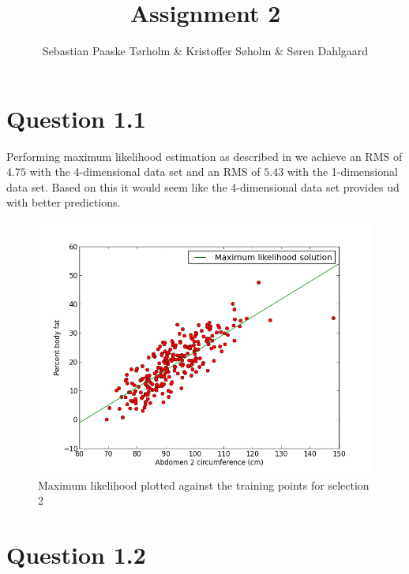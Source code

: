 \documentclass[11pt,a4paper]{article}
\title{Assignment 2}
\author{Sebastian Paaske Tørholm \& Kristoffer Søholm \& Søren Dahlgaard}
\begin{document}
\maketitle

\section{Question 1.1}
Performing maximum likelihood estimation as described in
\cite[sec. 3.1.1]{Bishop} we achieve an RMS of $4.75$ with the 4-dimensional
data set and an RMS of $5.43$ with the 1-dimensional data set. Based on this
it would seem like the 4-dimensional data set provides ud with better
predictions.

\begin{figure}[h!]
    \includegraphics[width=\textwidth]{images/prob11-sel2.png}
    \caption{Maximum likelihood plotted against the training points for selection 2}
\end{figure}

\section{Question 1.2}

\end{document}
